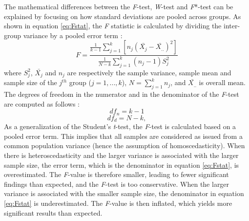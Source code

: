 \documentclass[
  english,
  man]{apa6}
\begin{document}
The mathematical differences between the \emph{F}-test, \emph{W}-test and \emph{F}*-test can be explained by focusing on how standard deviations are pooled across groups. As shown in equation \ref{eq:Fstat}, the \emph{F} statistic is calculated by dividing the inter-group variance by a pooled error term :\\
\begin{equation} 
F=\frac{\frac{1}{k-1}\sum_{j=1}^k \left[n_j(\bar{X_{j}}-\bar{X_{..}})^2\right]}{\frac{1}{N-k}\sum_{j=1}^k\left(n_j-1\right)S_j^2}
\label{eqn:Fstat}
\end{equation}
where \(S_{j}^2\), \(\bar{X_{j}}\) and \(n_{j}\) are respectively the sample variance, sample mean and sample size of the \(j^{th}\) group (\(j= 1,...,k\)), \(N=\sum_{j=1}^k n_j\), and \(\bar{X_{..}}\) is overall mean. The degrees of freedom in the numerator and in the denominator of the \emph{F}-test are computed as follows :\\
\begin{equation*} 
df_n=k-1
\label{eqn:FnumDF}
\end{equation*}
\begin{equation*} 
df_d= N-k, 
\label{eqn:FdenomDF}
\end{equation*}
As a generalization of the Student's \emph{t}-test, the \emph{F}-test is calculated based on a pooled error term. This implies that all samples are considered as issued from a common population variance (hence the assumption of homoscedasticity). When there is heteroscedasticity and the larger variance is associated with the larger sample size, the error term, which is the denominator in equation \ref{eq:Fstat}, is overestimated. The \emph{F}-value is therefore smaller, leading to fewer significant findings than expected, and the \emph{F}-test is too conservative. When the larger variance is associated with the smaller sample size, the denominator in equation \ref{eq:Fstat} is underestimated. The \emph{F}-value is then inflated, which yields more significant results than expected.
\end{document}
